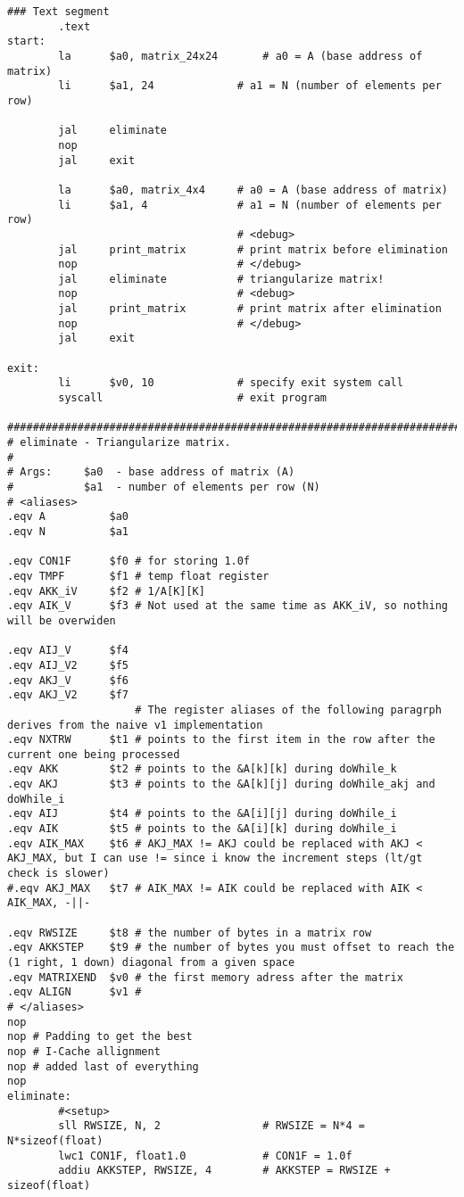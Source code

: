 \begin{verbatim}
### Text segment
        .text
start:
        la      $a0, matrix_24x24       # a0 = A (base address of matrix)
        li      $a1, 24             # a1 = N (number of elements per row)
        
        jal     eliminate
        nop
        jal     exit
        
        la      $a0, matrix_4x4     # a0 = A (base address of matrix)
        li      $a1, 4              # a1 = N (number of elements per row)
                                    # <debug>
        jal     print_matrix        # print matrix before elimination
        nop                         # </debug>
        jal     eliminate           # triangularize matrix!
        nop                         # <debug>
        jal     print_matrix        # print matrix after elimination
        nop                         # </debug>
        jal     exit

exit:
        li      $v0, 10             # specify exit system call
        syscall                     # exit program

################################################################################
# eliminate - Triangularize matrix.
#
# Args:     $a0  - base address of matrix (A)
#           $a1  - number of elements per row (N)
# <aliases>
.eqv A          $a0
.eqv N          $a1

.eqv CON1F      $f0 # for storing 1.0f
.eqv TMPF       $f1 # temp float register
.eqv AKK_iV     $f2 # 1/A[K][K]
.eqv AIK_V      $f3 # Not used at the same time as AKK_iV, so nothing will be overwiden

.eqv AIJ_V      $f4
.eqv AIJ_V2     $f5 
.eqv AKJ_V      $f6
.eqv AKJ_V2     $f7
                    # The register aliases of the following paragrph derives from the naive v1 implementation
.eqv NXTRW      $t1 # points to the first item in the row after the current one being processed
.eqv AKK        $t2 # points to the &A[k][k] during doWhile_k
.eqv AKJ        $t3 # points to the &A[k][j] during doWhile_akj and doWhile_i
.eqv AIJ        $t4 # points to the &A[i][j] during doWhile_i 
.eqv AIK        $t5 # points to the &A[i][k] during doWhile_i
.eqv AIK_MAX    $t6 # AKJ_MAX != AKJ could be replaced with AKJ < AKJ_MAX, but I can use != since i know the increment steps (lt/gt check is slower)
#.eqv AKJ_MAX   $t7 # AIK_MAX != AIK could be replaced with AIK < AIK_MAX, -||-

.eqv RWSIZE     $t8 # the number of bytes in a matrix row
.eqv AKKSTEP    $t9 # the number of bytes you must offset to reach the (1 right, 1 down) diagonal from a given space
.eqv MATRIXEND  $v0 # the first memory adress after the matrix
.eqv ALIGN      $v1 # 
# </aliases>
nop
nop # Padding to get the best
nop # I-Cache allignment
nop # added last of everything
nop
eliminate:
        #<setup>
        sll RWSIZE, N, 2                # RWSIZE = N*4 = N*sizeof(float)
        lwc1 CON1F, float1.0            # CON1F = 1.0f
        addiu AKKSTEP, RWSIZE, 4        # AKKSTEP = RWSIZE + sizeof(float)
        

\end{verbatim}
